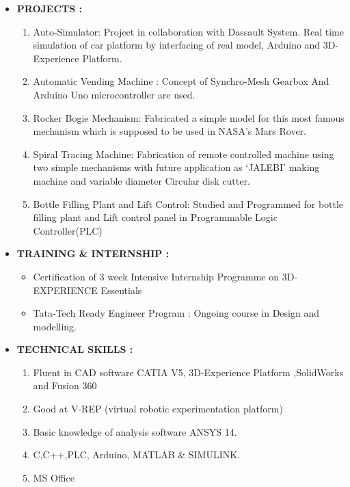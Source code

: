\documentclass[11pt]{article}
\begin{document}
\begin{itemize}[label=$\star$]
	 \bigskip
	\item	\begin{large} \textbf{PROJECTS :} \end{large}
	\begin{enumerate}
		\itemsep0em
		\item Auto-Simulator: Project in collaboration with Dassault System. Real time simulation of car platform by interfacing of real model, Arduino and 3D-Experience Platform. 
		\item Automatic Vending Machine : Concept of Synchro-Mesh Gearbox And Arduino Uno microcontroller are used.
		\item Rocker Bogie Mechanism: Fabricated a simple model for this most famous mechanism which is supposed to be used in NASA’s Mars Rover.
		\item Spiral Tracing Machine: Fabrication of remote controlled machine using two simple mechanisms with future application as ‘JALEBI’ making machine and variable diameter Circular disk cutter.
		\item Bottle Filling Plant and Lift Control: Studied and Programmed for bottle filling plant and Lift control panel in Programmable Logic Controller(PLC)
	\end{enumerate}
\bigskip
	\item	\begin{large} \textbf{TRAINING \& INTERNSHIP :} \end{large}
\begin{itemize}[label=$\bullet$]
	\itemsep0em
	\item Certification of 3 week Intensive Internship Programme on 3D-EXPERIENCE Essentials 
	\item Tata-Tech Ready Engineer Program : Ongoing course in Design and modelling.
\end{itemize}

 \bigskip
\item	\begin{large} \textbf{TECHNICAL SKILLS :} \end{large}
\begin{enumerate}
	\itemsep0em
	\item Fluent in CAD software CATIA V5, 3D-Experience Platform ,SolidWorks and Fusion 360 
	\item Good at V-REP (virtual robotic experimentation platform)
	\item Basic knowledge of analysis software ANSYS 14.
	\item C,C++,PLC, Arduino, MATLAB \& SIMULINK.
	\item MS Office
\end{enumerate}


\end{itemize}
\end{document}

